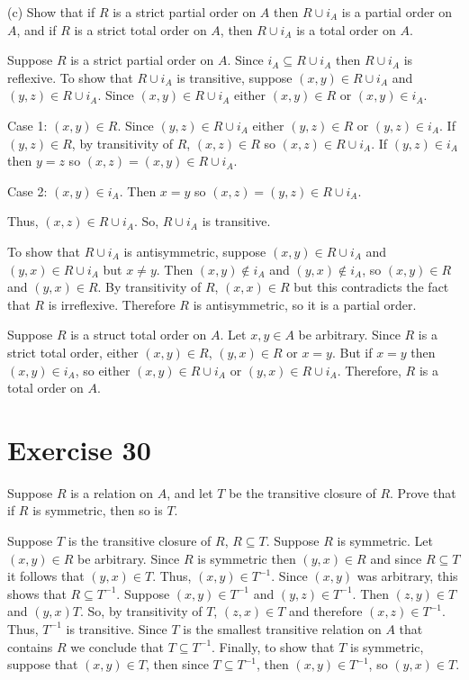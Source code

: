 \documentclass[11pt]{article}
\begin{document}
\noindent (c) Show that if $R$ is a strict partial order on $A$ then $R \cup i_A$
is a partial order on $A$, and if $R$ is a strict total order on $A$, then 
$R \cup i_A$ is a total order on $A$.

Suppose $R$ is a strict partial order on $A$. Since $i_A \subseteq R \cup i_A$
then $R \cup i_A$ is reflexive. To show that $R \cup i_A$ is transitive, suppose 
$(x,y) \in R \cup i_A$ and $(y,z) \in R \cup i_A$. Since $(x,y) \in R \cup i_A$
either $(x,y) \in R$ or $(x,y) \in i_A$.

Case 1: $(x,y) \in R$. Since $(y,z) \in R \cup i_A$ either $(y,z) \in R$ or 
$(y,z) \in i_A$. If $(y,z) \in R$, by transitivity of $R$, $(x,z) \in R$ so 
$(x,z) \in R \cup i_A$. If $(y,z) \in i_A$ then $y=z$ so $(x,z) =(x,y) \in R \cup i_A$.

Case 2: $(x,y) \in i_A$. Then $x=y$ so $(x,z) = (y,z) \in R \cup i_A$.

Thus, $(x,z) \in R \cup i_A$. So, $R \cup i_A$ is transitive.

To show that $R \cup i_A$ is antisymmetric, suppose $(x,y) \in R \cup i_A$ and 
$(y,x) \in R \cup i_A$ but $x \neq y$. Then $(x,y) \notin i_A$ and 
$(y,x) \notin i_A$, so $(x,y) \in R$ and $(y,x) \in R$. By transitivity of $R$,
$(x,x) \in R$ but this contradicts the fact that $R$ is irreflexive. Therefore
$R$ is antisymmetric, so it is a partial order.

Suppose $R$ is a struct total order on $A$. Let $x, y \in A$ be arbitrary. 
Since $R$ is a strict total order, either $(x,y) \in R$, $(y,x) \in R$ or $x=y$.
But if $x=y$ then $(x,y) \in i_A$, so either $(x,y) \in R \cup i_A$ or 
$(y,x) \in R \cup i_A$. Therefore, $R$ is a total order on $A$.

\section*{Exercise 30}

Suppose $R$ is a relation on $A$, and let $T$ be the transitive closure of $R$.
Prove that if $R$ is symmetric, then so is $T$.

Suppose $T$ is the transitive closure of $R$, $R \subseteq T$. Suppose $R$ is
symmetric. Let $(x,y) \in R$ be arbitrary. Since $R$ is symmetric then 
$(y,x) \in R$ and since $R \subseteq T$ it follows that $(y,x) \in T$. Thus, 
$(x,y) \in T^{-1}$. Since $(x,y)$ was arbitrary, this shows that 
$R \subseteq T^{-1}$. Suppose $(x,y) \in T^{-1}$ and $(y,z) \in T^{-1}$. Then 
$(z,y) \in T$ and $(y,x) T$. So, by transitivity of $T$, $(z,x) \in T$ and 
therefore $(x,z) \in T^{-1}$. Thus, $T^{-1}$ is transitive. Since $T$ is the 
smallest transitive relation on $A$ that contains $R$ we conclude that
$T \subseteq T^{-1}$. Finally, to show that $T$ is symmetric, suppose 
that $(x,y) \in T$, then since $T \subseteq T^{-1}$, then $(x,y) \in T^{-1}$,
so $(y,x) \in T$.
\end{document}
